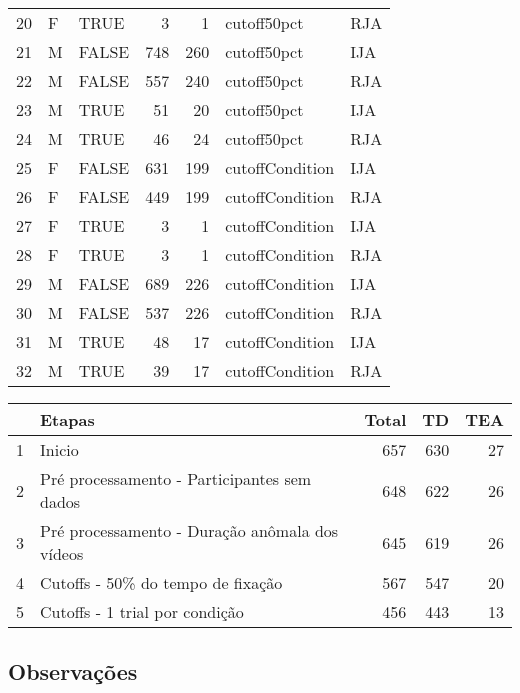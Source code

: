 \documentclass{article}
\begin{document}
\begin{table}[ht]
\begin{tabular}{rllrrll}
  20 & F & TRUE &   3 &   1 & cutoff50pct & RJA \\ 
  21 & M & FALSE & 748 & 260 & cutoff50pct & IJA \\ 
  22 & M & FALSE & 557 & 240 & cutoff50pct & RJA \\ 
  23 & M & TRUE &  51 &  20 & cutoff50pct & IJA \\ 
  24 & M & TRUE &  46 &  24 & cutoff50pct & RJA \\ 
  25 & F & FALSE & 631 & 199 & cutoffCondition & IJA \\ 
  26 & F & FALSE & 449 & 199 & cutoffCondition & RJA \\ 
  27 & F & TRUE &   3 &   1 & cutoffCondition & IJA \\ 
  28 & F & TRUE &   3 &   1 & cutoffCondition & RJA \\ 
  29 & M & FALSE & 689 & 226 & cutoffCondition & IJA \\ 
  30 & M & FALSE & 537 & 226 & cutoffCondition & RJA \\ 
  31 & M & TRUE &  48 &  17 & cutoffCondition & IJA \\ 
  32 & M & TRUE &  39 &  17 & cutoffCondition & RJA \\ 
   \hline
\end{tabular}
\end{table}







\begin{table}[ht]
\centering
\begin{tabular}{rlrrr}
  \hline
 & Etapas & Total & TD & TEA \\
  \hline
1 & Inicio & 657 & 630 &  27 \\
  2 & Pré processamento - Participantes sem dados & 648 & 622 &  26 \\
  3 & Pré processamento - Duração anômala dos vídeos & 645 & 619 &  26 \\
  4 & Cutoffs - 50\% do tempo de fixação & 567 & 547 &  20 \\
  5 & Cutoffs - 1 trial por condição & 456 & 443 &  13 \\
   \hline
\end{tabular}
\end{table}

\subsection{Observações}
\end{document}
